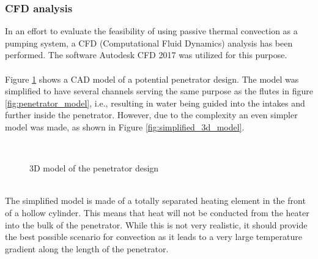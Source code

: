\subsubsection{CFD analysis}
In an effort to evaluate the feasibility of using passive thermal convection as a pumping system, a CFD (Computational Fluid Dynamics) analysis has been performed. The software Autodesk CFD 2017 was utilized for this purpose. 
\\
\\
Figure \ref{fig:3d_model} shows a CAD model of a potential penetrator design. The model was simplified to have several channels serving the same purpose as the flutes in figure \ref{fig:penetrator_model}, i.e., resulting in water being guided into the intakes and further inside the penetrator. However, due to the complexity an even simpler model was made, as shown in Figure \ref{fig:simplified_3d_model}. 
\\
\begin{figure}[htb]
	\centering
	\\
	\caption{3D model of the penetrator design}
	\label{fig:3d_model}
\end{figure}
\\
The simplified model is made of a totally separated heating element in the front of a hollow cylinder. This means that heat will not be conducted from the heater into the bulk of the penetrator. While this is not very realistic, it should provide the best possible scenario for convection as it leads to a very large temperature gradient along the length of the penetrator.

